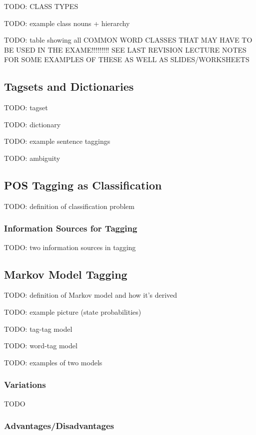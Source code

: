 \documentclass{article}
\begin{document}
TODO: CLASS TYPES

TODO: example class nouns + hierarchy

TODO: table showing all COMMON WORD CLASSES THAT MAY HAVE TO BE USED IN THE EXAME!!!!!!!!! SEE LAST REVISION LECTURE NOTES FOR SOME EXAMPLES OF THESE AS WELL AS SLIDES/WORKSHEETS

\subsection{Tagsets and Dictionaries}

TODO: tagset

TODO: dictionary

TODO: example sentence taggings

TODO: ambiguity

\subsection{POS Tagging as Classification}

TODO: definition of classification problem

\subsubsection{Information Sources for Tagging}

TODO: two information sources in tagging

\subsection{Markov Model Tagging}

TODO: definition of Markov model and how it's derived

TODO: example picture (state probabilities)

TODO: tag-tag model

TODO: word-tag model

TODO: examples of two models

\subsubsection{Variations}

TODO

\subsubsection{Advantages/Disadvantages}
\end{document}
